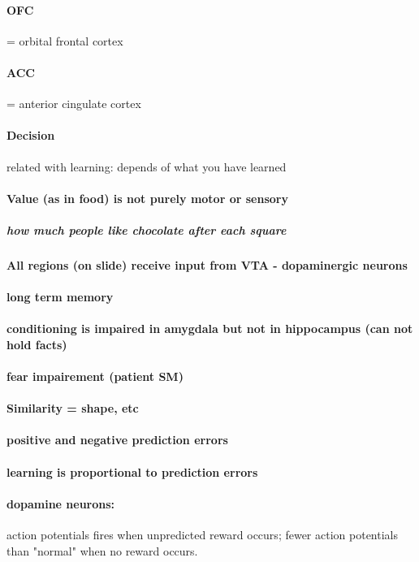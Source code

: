 \documentclass[12pt,article,oneside,a4paper]{memoir}
\begin{document}
\paragraph{OFC} = orbital frontal cortex
\paragraph{ACC} = anterior cingulate cortex

\paragraph{Decision} related with learning: depends of what you have learned
\paragraph{Value (as in food) is not purely motor or sensory}
\subparagraph{how much people like chocolate after each square}
\paragraph{All regions (on slide) receive input from VTA - dopaminergic neurons}

\paragraph{long term memory}
\paragraph{conditioning is impaired in amygdala but not in hippocampus (can not hold facts)}
\paragraph{fear impairement (patient SM)}
\paragraph{Similarity = shape, etc}
\paragraph{positive and negative prediction errors}
\paragraph{learning is proportional to prediction errors}

\paragraph{dopamine neurons:} action potentials fires when unpredicted reward occurs; fewer action potentials than "normal" when no reward occurs.
\end{document}
